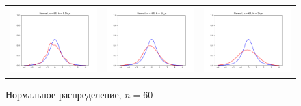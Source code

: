 	\begin{figure}[H]
		\centering
		\begin{tabular}{ccc}
			\includegraphics[width=55mm, height =0.25\textheight]{pics/ker_n_60_1.png}
			&
			\includegraphics[width=55mm, height =0.25\textheight]{pics/ker_n_60_2.png}
			&
			\includegraphics[width=55mm, height =0.25\textheight]{pics/ker_n_60_3.png}
		\end{tabular}
		\caption{Нормальное распределение, $n = 60$}
		\label{fig:normal}
	\end{figure}

